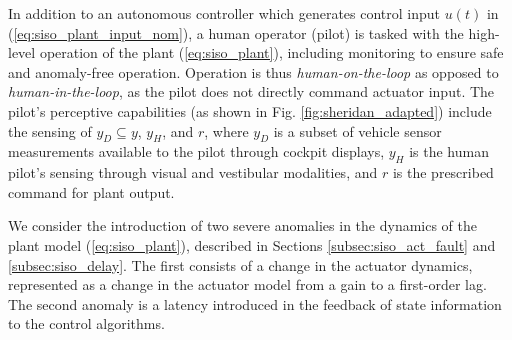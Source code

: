 In addition to an autonomous controller which generates control input $u(t)$ in (\ref{eq:siso_plant_input_nom}), a human operator (pilot) is tasked with the high-level operation of the plant (\ref{eq:siso_plant}), including monitoring to ensure safe and anomaly-free operation. Operation is thus \textit{human-on-the-loop} as opposed to \textit{human-in-the-loop}, as the pilot does not directly command actuator input. The pilot's perceptive capabilities (as shown in Fig. \ref{fig:sheridan_adapted}) include the sensing of $y_{D} \subseteq y$, $y_{H}$, and $r$, where $y_{D}$ is a subset of vehicle sensor measurements available to the pilot through cockpit displays, $y_{H}$ is the human pilot's sensing through visual and vestibular modalities, and $r$ is the prescribed command for plant output.



We consider the introduction of two severe anomalies in the dynamics of the plant model (\ref{eq:siso_plant}), described in Sections \ref{subsec:siso_act_fault} and \ref{subsec:siso_delay}. The first consists of a change in the actuator dynamics, represented as a change in the actuator model from a gain to a first-order lag. The second anomaly is a latency introduced in the feedback of state information to the control algorithms. 



